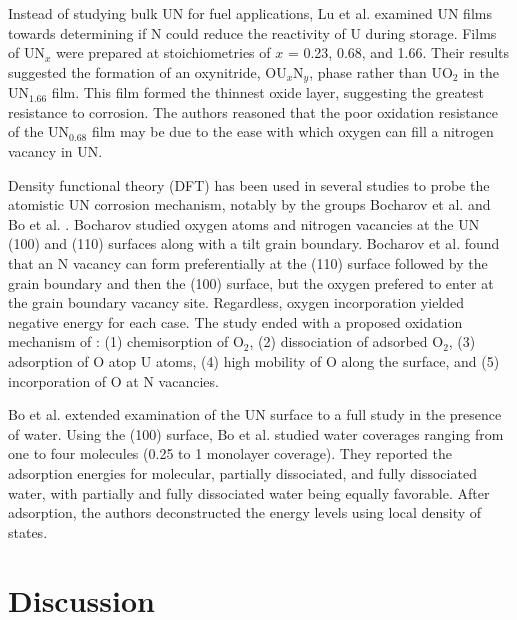 \documentclass[11pt]{article}
\begin{document}
\begin{multicols}{2}
 Instead of studying bulk UN for fuel applications, Lu et al. \cite{Lu2016} examined UN films towards determining if N could reduce the reactivity of U during storage.  Films of UN$_{x}$ were prepared at stoichiometries of $x$ = 0.23, 0.68, and 1.66. Their results suggested the formation of an oxynitride, OU$_{x}$N$_{y}$, phase rather than UO$_{2}$ in the UN$_{1.66}$ film. This film formed the thinnest oxide layer, suggesting the greatest resistance to corrosion. The authors reasoned that the poor oxidation resistance of the UN$_{0.68}$ film may be due to the ease with which oxygen can fill a nitrogen vacancy in UN.
\par 
Density functional theory (DFT) has been used in several studies to probe the atomistic UN corrosion mechanism, notably by the groups Bocharov et al. \cite{Bocharov2013} and Bo et al. \cite{Bo2016}. Bocharov studied oxygen atoms and nitrogen vacancies at the UN (100) and (110) surfaces along with a tilt grain boundary. Bocharov et al. found that an N vacancy can form preferentially at the (110) surface followed by the grain boundary and then the (100) surface, but the oxygen prefered to enter at the grain boundary vacancy site. Regardless, oxygen incorporation yielded negative energy for each case. The study ended with a proposed oxidation mechanism of \cite{Bocharov2013}: 
	(1) chemisorption of O$_{2}$,
	(2) dissociation of adsorbed O$_{2}$,
	(3) adsorption of O atop U atoms,
	(4) high mobility of O along the surface, and
	(5) incorporation of O at N vacancies.
\par 
Bo et al. \cite{Bo2016} extended examination of the UN surface to a full study in the presence of water. Using the (100) surface, Bo et al. studied water coverages ranging from one to four molecules (0.25 to 1 monolayer coverage). They reported the adsorption energies for molecular, partially dissociated, and fully dissociated water, with partially and fully dissociated water being equally favorable. After adsorption, the authors deconstructed the energy levels using local density of states. 

\section{Discussion}


\end{multicols}
\end{document}
